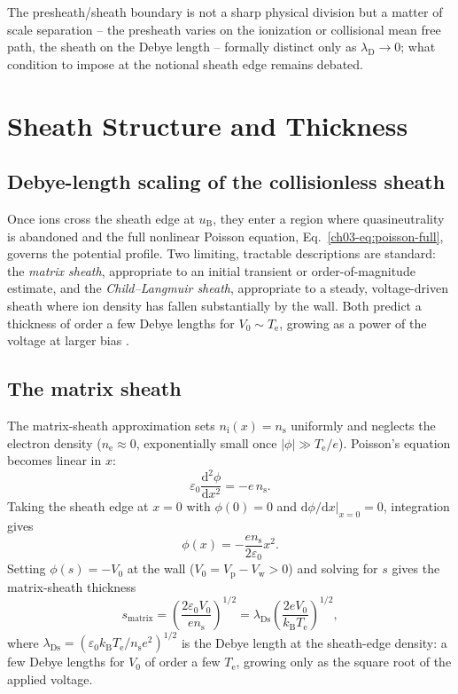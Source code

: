 The presheath/sheath boundary is not a sharp physical division but a matter of scale separation -- the presheath varies on the ionization or collisional mean free path, the sheath on the Debye length -- formally distinct only as $\lambda_{\mathrm{D}} \to 0$; what condition to impose at the notional sheath edge remains debated.

\section{Sheath Structure and Thickness}

\subsection{Debye-length scaling of the collisionless sheath}

Once ions cross the sheath edge at $u_{\mathrm{B}}$, they enter a region where quasineutrality is abandoned and the full nonlinear Poisson equation, Eq.~\eqref{ch03-eq:poisson-full}, governs the potential profile. Two limiting, tractable descriptions are standard: the \emph{matrix sheath}, appropriate to an initial transient or order-of-magnitude estimate, and the \emph{Child--Langmuir sheath}, appropriate to a steady, voltage-driven sheath where ion density has fallen substantially by the wall. Both predict a thickness of order a few Debye lengths for $V_{0} \sim T_{\mathrm{e}}$, growing as a power of the voltage at larger bias \cite{ref0012,ref0024}.

\subsection{The matrix sheath}

The matrix-sheath approximation sets $n_{\mathrm{i}}(x) = n_{\mathrm{s}}$ uniformly and neglects the electron density ($n_{\mathrm{e}} \approx 0$, exponentially small once $|\phi| \gg T_{\mathrm{e}}/e$). Poisson's equation becomes linear in $x$:
\begin{equation}
\varepsilon_{0} \frac{\mathrm{d}^{2}\phi}{\mathrm{d}x^{2}} = -e\, n_{\mathrm{s}}.
\end{equation}
Taking the sheath edge at $x=0$ with $\phi(0)=0$ and $\mathrm{d}\phi/\mathrm{d}x|_{x=0}=0$, integration gives
\begin{equation}
\phi(x) = -\frac{e n_{\mathrm{s}}}{2\varepsilon_{0}} x^{2}.
\end{equation}
Setting $\phi(s) = -V_{0}$ at the wall ($V_{0} = V_{\mathrm{p}} - V_{\mathrm{w}} > 0$) and solving for $s$ gives the matrix-sheath thickness
\begin{equation}
s_{\mathrm{matrix}} = \left( \frac{2 \varepsilon_{0} V_{0}}{e n_{\mathrm{s}}} \right)^{1/2} = \lambda_{\mathrm{Ds}} \left( \frac{2 e V_{0}}{k_{\mathrm{B}} T_{\mathrm{e}}} \right)^{1/2},
\label{eq:matrix-sheath}
\end{equation}
where $\lambda_{\mathrm{Ds}} = (\varepsilon_{0} k_{\mathrm{B}} T_{\mathrm{e}} / n_{\mathrm{s}} e^{2})^{1/2}$ is the Debye length at the sheath-edge density: a few Debye lengths for $V_{0}$ of order a few $T_{\mathrm{e}}$, growing only as the square root of the applied voltage.

